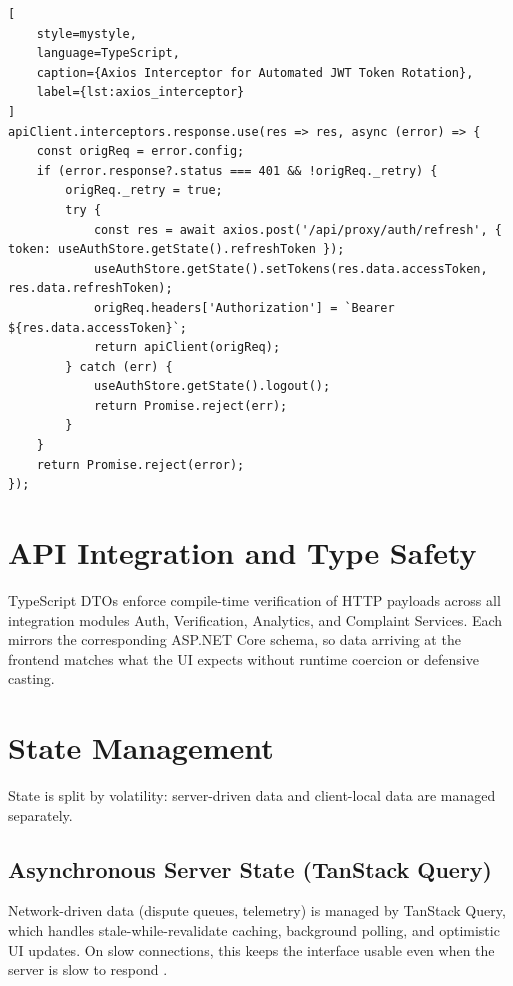 \begin{lstlisting}[
    style=mystyle,
    language=TypeScript,
    caption={Axios Interceptor for Automated JWT Token Rotation},
    label={lst:axios_interceptor}
]
apiClient.interceptors.response.use(res => res, async (error) => {
    const origReq = error.config;
    if (error.response?.status === 401 && !origReq._retry) {
        origReq._retry = true;
        try {
            const res = await axios.post('/api/proxy/auth/refresh', { token: useAuthStore.getState().refreshToken });
            useAuthStore.getState().setTokens(res.data.accessToken, res.data.refreshToken);
            origReq.headers['Authorization'] = `Bearer ${res.data.accessToken}`;
            return apiClient(origReq);
        } catch (err) {
            useAuthStore.getState().logout();
            return Promise.reject(err);
        }
    }
    return Promise.reject(error);
});
\end{lstlisting}

\section{API Integration and Type Safety}
\label{sec:api-integration}

TypeScript DTOs enforce compile-time verification of HTTP payloads across all integration modules Auth, Verification, Analytics, and Complaint Services. Each mirrors the corresponding ASP.NET Core schema, so data arriving at the frontend matches what the UI expects without runtime coercion or defensive casting.

\section{State Management}
\label{sec:state-management}

State is split by volatility: server-driven data and client-local data are managed separately.

\subsection{Asynchronous Server State (TanStack Query)}
Network-driven data (dispute queues, telemetry) is managed by TanStack Query, which handles stale-while-revalidate caching, background polling, and optimistic UI updates. On slow connections, this keeps the interface usable even when the server is slow to respond \cite{tanstack2024}.

